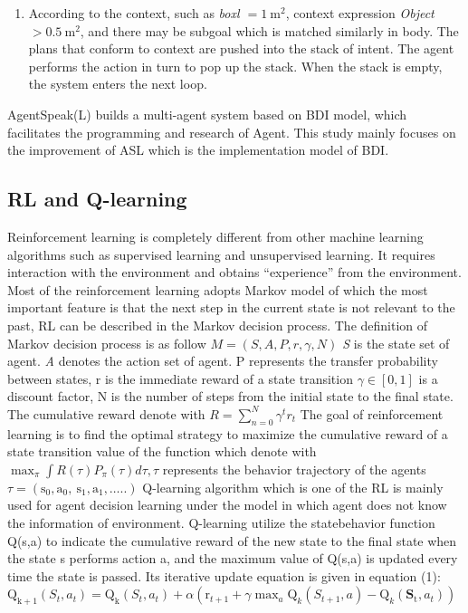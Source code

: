 \documentclass{article}
\begin{document}
\begin{multicols}{2}
\begin{enumerate}[1.]
    \item According to the context, such as \textit{boxl $=1 \mathrm{~m}^2$}, context expression\textit{ Object $>0.5 \mathrm{~m}^2$}, and there may be subgoal which is matched similarly in body. The plans that conform to context are pushed into the stack of intent. The agent performs the action in turn to pop up the stack. When the stack is empty, the system enters the next loop.
\end{enumerate}
AgentSpeak(L) builds a multi-agent system based on BDI
model, which facilitates the programming and research of Agent.
This study mainly focuses on the improvement of ASL which is
the implementation model of BDI.

\subsection{ RL and Q-learning}
Reinforcement learning is completely different from other
machine learning algorithms such as supervised learning and
unsupervised learning. It requires interaction with the
environment and obtains “experience” from the environment.
Most of the reinforcement learning adopts Markov model of
which the most important feature is that the next step in the
current state is not relevant to the past, RL can be described in the
Markov decision process. The definition of Markov decision
process is as follow \textit{$M=(S, A, P, r, \gamma, N)$  S}
is the state set of
agent. \textit{A} denotes the action set of agent. P
represents the transfer
probability between states, r is the immediate reward of a state
transition $\gamma \in [0,1]$
is a discount factor, N is the number of steps
from the initial state to the final state. The cumulative reward
denote with $R=\sum_{n=0}^N \gamma^t r_t$ The goal of reinforcement learning is to find
the optimal strategy to maximize the cumulative reward of a state transition value of
the function which denote with $\max _\pi \int R(\tau) P_\pi(\tau) d \tau, \tau$ represents the
behavior trajectory of the agents $\tau=\left(\mathrm{s}_0, \mathrm{a}_0, \mathrm{~s}_1, \mathrm{a}_1, \ldots ..\right)$
Q-learning algorithm which is one of the RL is mainly used for
agent decision learning under the model in which agent does not
know the information of environment. Q-learning utilize the statebehavior function Q(s,a) to indicate the cumulative reward of the
new state to the final state when the state s performs action a, and the maximum value of Q(s,a) is updated every time the state is
passed. Its iterative update equation is given in equation (1):\\
$\mathrm{Q}_{\mathrm{k}+1}\left(S_t, a_t\right)=\mathrm{Q}_{\mathrm{k}}\left(S_t, a_t\right)+\alpha\left(\mathrm{r}_{t+1}+\gamma \max _a \mathrm{Q}_k\left(S_{t+1}, a\right)-\mathrm{Q}_k\left(\mathbf{S}_{\mathrm{t}}, a_t\right)\right)$ \\


\end{multicols}
\end{document}
